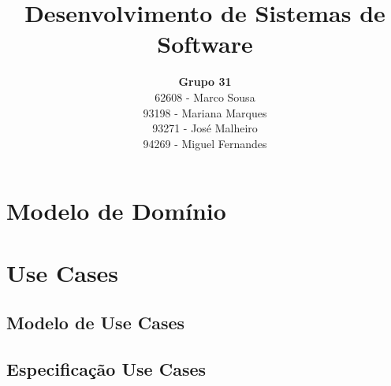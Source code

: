 \documentclass[a4paper, 12pt]{article}
\title {Desenvolvimento de Sistemas de Software}
\author{\textbf{Grupo 31} \\
        62608 - Marco Sousa \\
        93198 - Mariana Marques \\
        93271 - José Malheiro \\
        94269 - Miguel Fernandes}
\begin{document}
\maketitle

\section{Modelo de Domínio}

\section{Use Cases}

\subsection{Modelo de Use Cases}

\subsection{Especificação Use Cases}

\subsubsection{} \label{pedir_rep_normal}


\subsubsection{} \label{fazer_orcamento}


\subsubsection{} \label{confirmar_orcamento}


\subsubsection{} \label{realizar_rep}


\subsubsection{} \label{entregar_equipamento}

\end{document}

